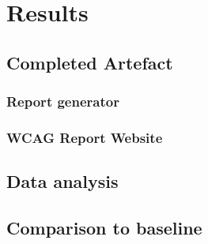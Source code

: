 \chapter{Results}\label{cha:results}


\section{Completed Artefact}

\subsection{Report generator}

\subsection{WCAG Report Website}

\section{Data analysis}

\section{Comparison to baseline}
